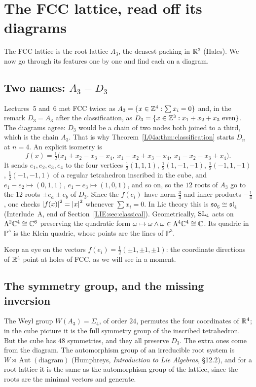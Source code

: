 \section{The FCC lattice, read off its diagrams}
\label{DYN:sec:fcc}

The FCC lattice is the root lattice $A_3$, the densest packing in $\mathbb{R}^3$ (Hales). We now go through
its features one by one and find each on a diagram.

\subsection*{Two names: $A_3=D_3$}
Lectures~5 and~6 met FCC twice: as $A_3=\{x\in\mathbb{Z}^4:\sum x_i=0\}$ and, in the remark $D_3=A_3$ after the
classification, as $D_3=\{x\in\mathbb{Z}^3:x_1+x_2+x_3\text{ even}\}$.
The diagrams agree: $D_3$ would be a chain of two nodes both joined to a third, which is the chain
$A_3$. That is why Theorem~\ref{L04a:thm:classification} starts $D_n$ at $n=4$. An explicit isometry is
\[
  f(x)=\tfrac12\big(x_1+x_2-x_3-x_4,\ x_1-x_2+x_3-x_4,\ x_1-x_2-x_3+x_4\big).
\]
It sends $e_1,e_2,e_3,e_4$ to the four vertices $\frac12(1,1,1)$, $\frac12(1,-1,-1)$,
$\frac12(-1,1,-1)$, $\frac12(-1,-1,1)$ of a regular tetrahedron inscribed in the cube, and
$e_1-e_2\mapsto(0,1,1)$, $e_1-e_3\mapsto(1,0,1)$, and so on, so the $12$ roots of $A_3$ go to the $12$ roots
$\pm e_a\pm e_b$ of $D_3$. Since the $f(e_i)$ have norm $\frac34$ and inner products $-\frac14$, one checks
$\left\lvert f(x) \right\rvert^2=\left\lvert x \right\rvert^2$ whenever $\sum x_i=0$. In Lie theory this is $\mathfrak{so}_6\cong\mathfrak{sl}_4$
(Interlude~A, end of Section~\ref{LIE:sec:classical}). Geometrically, $\mathrm{SL}_4$ acts on
$\Lambda^2\mathbb{C}^4\cong\mathbb{C}^6$ preserving the quadratic form $\omega\mapsto\omega\wedge\omega\in\Lambda^4\mathbb{C}^4\cong\mathbb{C}$.
Its quadric in $\mathbb P^5$ is the Klein quadric, whose points are the lines of $\mathbb P^3$.

Keep an eye on the vectors $f(e_i)=\frac12(\pm1,\pm1,\pm1)$: the coordinate directions of $\mathbb{R}^4$ point
at holes of FCC, as we will see in a moment.

\subsection*{The symmetry group, and the missing inversion}
The Weyl group $W(A_3)=\Sigma_4$, of order $24$, permutes the four coordinates of $\mathbb{R}^4$; in the cube
picture it is the full symmetry group of the inscribed tetrahedron. But the cube has $48$ symmetries,
and they all preserve $D_3$. The extra ones come from the diagram. The automorphism group of an
irreducible root system is $W\rtimes\operatorname{Aut}(\text{diagram})$ (Humphreys, \emph{Introduction
to Lie Algebras}, \S12.2), and for a root lattice it is the same as the automorphism group of the lattice,
since the roots are the minimal vectors and generate.

